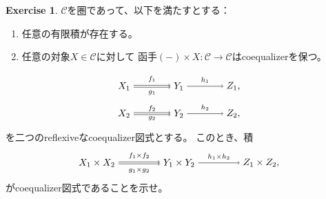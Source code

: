 \documentclass[uplatex]{jsarticle}
\theoremstyle{definition}
\newtheorem{prob}[prob]{Exercise}
\def\mcC{\mathcal{C}}
\begin{document}
\begin{prob}\label{prob: 0.1}
  \(\mcC\)を圏であって、以下を満たすとする：
  \begin{enumerate}
    \item
    任意の有限積が存在する。
    \item \label{enumi: prob: 0.1 condition 2}
    任意の対象\(X\in \mcC\)に対して
    函手\((-)\times X : \mcC\to \mcC\)はcoequalizerを保つ。
  \end{enumerate}
  \[
  \begin{tikzpicture}[auto]
    \node (A) at (0,1) {\(X_1\)};
    \node (A') at (0,0) {\(X_2\)};
    \node (B) at (2,1) {\(Y_1\)};
    \node (B') at (2,0) {\(Y_2\)};
    \node (C) at (4,1) {\(Z_1\),};
    \node (C') at (4,0) {\(Z_2\),};
    \draw[->,transform canvas={yshift=1pt}] (A) to node {\(\scriptstyle f_1\)} (B);
    \draw[->,transform canvas={yshift=-1pt}] (A) to node[swap] {\(\scriptstyle g_1\)} (B);
    \draw[->,transform canvas={yshift=-1pt}] (A') to node {\(\scriptstyle f_2\)} (B');
    \draw[->,transform canvas={yshift=1pt}] (A') to node[swap] {\(\scriptstyle g_2\)} (B');
    \draw[->] (B) to node {\(\scriptstyle h_1\)} (C);
    \draw[->] (B') to node {\(\scriptstyle h_2\)} (C');
  \end{tikzpicture}
  \]
  を二つのreflexiveなcoequalizer図式とする。
  このとき、積
  \[
  \begin{tikzpicture}[auto]
    \node (A) at (0,0) {\(X_1 \times X_2\)};
    \node (B) at (3,0) {\(Y_1 \times Y_2\)};
    \node (C) at (6,0) {\(Z_1 \times Z_2\),};
    \draw[->,transform canvas={yshift=1pt}] (A) to node {\(\scriptstyle f_1\times f_2\)} (B);
    \draw[->,transform canvas={yshift=-1pt}] (A) to node[swap] {\(\scriptstyle g_1 \times g_2\)} (B);
    \draw[->] (B) to node {\(\scriptstyle h_1 \times h_2\)} (C);
  \end{tikzpicture}
  \]
  がcoequalizer図式であることを示せ。
\end{prob}
\end{document}
